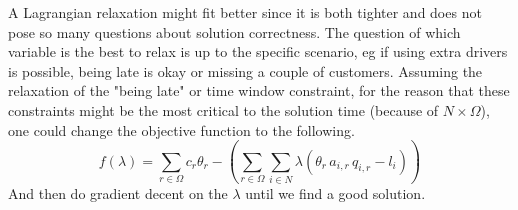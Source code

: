 \documentclass{article}
\begin{document}
    A Lagrangian relaxation might fit better since it is both tighter and does not pose so many questions about solution correctness.
    The question of which variable is the best to relax is up to the specific scenario, eg if using extra drivers is possible, being late is okay or missing a couple of customers.
    Assuming the relaxation of the "being late" or time window constraint, for the reason that these constraints might be the most critical to the solution time (because of $N \times \Omega$), one could change the objective function to the following.
    \[
        f(\lambda) = \displaystyle\sum_{r \in \Omega} c_r \theta_r - \left( \sum_{r \in \Omega} \sum_{i \in N} \lambda \left( \theta_r \, a_{i,r} \, q_{i,r} - l_i \right) \right)
    \]
    And then do gradient decent on the $\lambda$ until we find a good solution.
\end{document}

